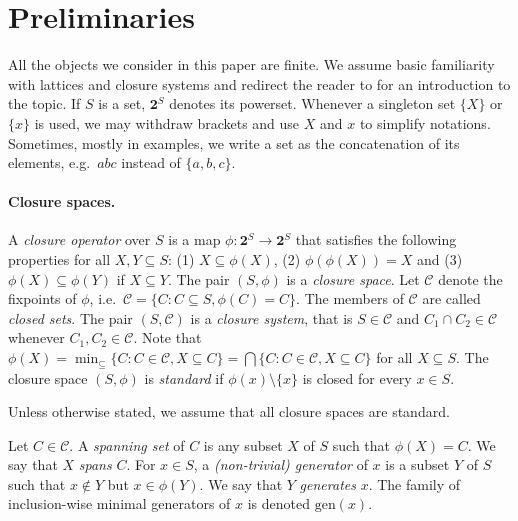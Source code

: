 \documentclass[12pt, a4paper]{article}
\newcommand{\cc}[1]{\mathcal{#1}}  %
\newcommand{\st}{:}  %
\newcommand{\U}{S}  %
\newcommand{\pow}[1]{\mathbf{2}^{#1}}  %
\newcommand{\cl}{\phi}  %
\newcommand{\cs}{\cc{C}} %
\newcommand{\gen}{\mathrm{gen}}  %
\begin{document}
\section{Preliminaries} \label{sec:preliminaries}

All the objects we consider in this paper are finite.
We assume basic familiarity with lattices and closure systems and redirect the reader to \cite{gratzer2011lattice} for an introduction to the topic.
If $\U$ is a set, $\pow{\U}$ denotes its powerset.
Whenever a singleton set $\{X\}$ or $\{x\}$ is used, we may withdraw brackets and use $X$ and $x$ to simplify notations.
Sometimes, mostly in examples, we write a set as the concatenation of its elements, e.g.\ $abc$ instead of $\{a, b, c\}$.

\paragraph{Closure spaces.}
A \emph{closure operator} over $\U$ is a map $\cl \colon \pow{\U} \to \pow{\U}$ that satisfies the following properties for all $X, Y \subseteq \U$: (1) $X \subseteq \cl(X)$, (2) $\cl(\cl(X)) = X$ and (3) $\cl(X) \subseteq \cl(Y)$ if $X \subseteq Y$.
The pair $(\U, \cl)$ is a \emph{closure space}.
Let $\cs$ denote the fixpoints of $\cl$, i.e.\ $\cs = \{C \st C \subseteq \U, \cl(C) = C\}$.
The members of $\cs$ are called \emph{closed sets}.
The pair $(\U, \cs)$ is a \emph{closure system}, that is $\U \in \cs$ and $C_1 \cap C_2 \in \cs$ whenever $C_1, C_2 \in \cs$.
Note that $\cl(X) = \min_{\subseteq}\{C \st C \in \cs, X \subseteq C\} = \bigcap \{C \st C \in \cs, X \subseteq C\}$ for all $X \subseteq \U$.
The closure space $(\U, \cl)$ is \emph{standard} if $\cl(x) \setminus \{x\}$ is closed for every $x \in \U$.

\begin{remark}
Unless otherwise stated, we assume that all closure spaces are standard.
\end{remark}

Let $C \in \cs$.
A \emph{spanning set} of $C$ is any subset $X$ of $\U$ such that $\cl(X) = C$.
We say that $X$ \emph{spans} $C$. 
For $x \in \U$, a \emph{(non-trivial) generator} of $x$ is a subset $Y$ of $\U$ such that $x \notin Y$ but $x \in \cl(Y)$.
We say that $Y$ \emph{generates} $x$.
The family of inclusion-wise minimal generators of $x$ is denoted $\gen(x)$.
\end{document}
